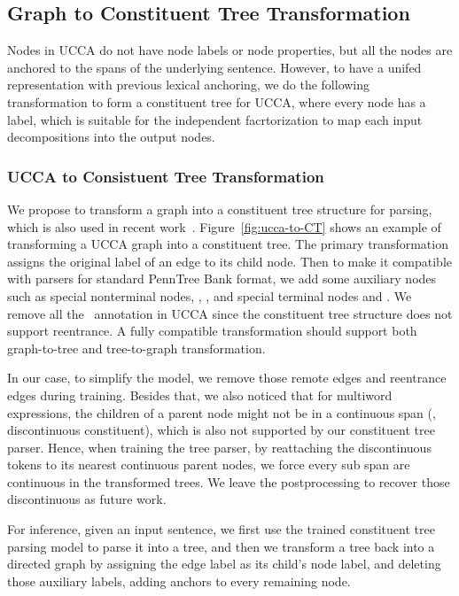 
\subsection{Graph to Constituent Tree Transformation}
\label{ssec:phr:graph-ct}
Nodes in UCCA do not have node labels or node properties, but all the
nodes are anchored to the spans of the underlying sentence. However,
to have a unifed representation with previous lexical anchoring, we do
the following transformation to form a constituent tree for UCCA,
where every node has a label, which is suitable for the independent
facrtorization to map each input decompositions into the output nodes.

\subsubsection{UCCA to Consistuent Tree Transformation}
\label{sssec:phr:ucca-to-ct}
We propose to transform a graph into a constituent tree structure for
parsing, which is also used in recent work~\cite{jiang2019hlt}.
Figure~\ref{fig:ucca-to-CT} shows an example of transforming a UCCA
graph into a constituent tree. The primary transformation assigns the
original label of an edge to its child node. Then to make it
compatible with parsers for standard PennTree Bank format, we add some
auxiliary nodes such as special nonterminal nodes, ,
, and special terminal nodes  and . We
remove all the~ annotation in UCCA since the
constituent tree structure does not support reentrance.  A fully
compatible transformation should support both graph-to-tree and
tree-to-graph transformation.

In our case, to simplify the model, we remove those remote edges and
reentrance edges during training. Besides that, we also noticed that
for multiword expressions, the children of a parent node might not be
in a continuous span (\eg, discontinuous constituent), which is also
not supported by our constituent tree parser. Hence, when training the
tree parser, by reattaching the discontinuous tokens to its nearest
continuous parent nodes, we force every sub span are continuous in the
transformed trees. We leave the postprocessing to recover those
discontinuous as future work.

For inference, given an input sentence, we first use the trained
constituent tree parsing model to parse it into a tree, and then we
transform a tree back into a directed graph by assigning the edge
label as its child's node label, and deleting those auxiliary labels,
adding anchors to every remaining node.

